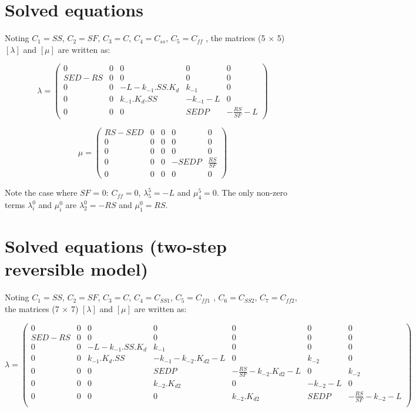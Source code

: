 \section{Solved equations}

Noting $C_1 = SS$, $C_2 = SF$, $C_3 =C$, $C_4 = C_{ss}$, $C_5 = C_{ff}$ ,
the matrices (5 $\times$ 5) $[\lambda]$ and $[\mu]$
are written as:

$$  \lambda = 
  \begin{pmatrix}
    0 & 0 & 0 & 0 & 0\\
    SED-RS & 0 & 0 & 0 & 0\\
    0 & 0 & -L -k_{-1}.SS.K_d & k_{-1} & 0\\
    0 & 0 & k_{-1}.K_d.SS & -k_{-1} - L & 0\\
    0 & 0 & 0 & SEDP & -\frac{RS}{SF}-L
  \end{pmatrix}
$$  

$$  \mu = 
  \begin{pmatrix}
    RS-SED & 0 & 0 & 0 & 0\\
    0 & 0 & 0 & 0 & 0\\
    0 & 0 & 0 & 0 & 0\\
    0 & 0 & 0 & -SEDP & \frac{RS}{SF}\\
    0 & 0 & 0 & 0 & 0
  \end{pmatrix}
$$  

Note the case where $SF$ = 0: $C_{ff} = 0$, $\lambda_5^5 = -L$ and $\mu_4^5 = 0$.
The only non-zero terms $\lambda_i^0$ and $\mu_i^0$ are $\lambda_2^0 = -RS$ and $\mu_1^0 = RS$.

\section{Solved equations (two-step reversible model)}

Noting $C_1 = SS$, $C_2 = SF$, $C_3 =C$, $C_4 = C_{SS1}$, $C_5 = C_{ff1}$ ,
$C_6 = C_{SS2}$, $C_7 = C_{ff2}$,
the matrices (7 $\times$ 7) $[\lambda]$ and $[\mu]$
are written as:

$$  \lambda = 
  \begin{pmatrix}
    0 & 0 & 0 & 0 & 0 & 0 & 0\\
    SED-RS & 0 & 0 & 0 & 0 & 0 & 0\\
    0 & 0 & -L -k_{-1}.SS.K_d & k_{-1} & 0 & 0 & 0\\
    0 & 0 & k_{-1}.K_d.SS & -k_{-1}-k_{-2}.K_{d2} - L & 0 & k_{-2} & 0\\
    0 & 0 & 0 & SEDP & -\frac{RS}{SF}-k_{-2}.K_{d2}-L & 0 & k_{-2}\\
    0 & 0 & 0 & k_{-2}.K_{d2} & 0 & -k_{-2}-L & 0\\
    0 & 0 & 0 & 0 & k_{-2}.K_{d2} & SEDP & -\frac{RS}{SF}-k_{-2}-L\\
  \end{pmatrix}
$$  


